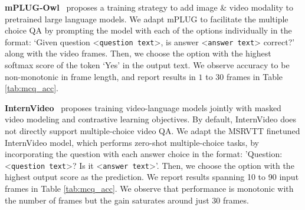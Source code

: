 \noindent\textbf{mPLUG-Owl}~\cite{mplugowl} proposes a training strategy to add image \& video modality to pretrained large language models. We adapt mPLUG to facilitate the multiple choice QA by prompting the model with each of the options individually in the format: `Given question <\texttt{question text}>, is answer <\texttt{answer text}> correct?' along with the video frames. Then, we choose the option with the highest softmax score of the token `Yes' in the output text. We observe accuracy to be non-monotonic in frame length, and report results in $1$ to $30$ frames in Table \ref{tab:mcq_acc}.

\noindent\textbf{InternVideo}~\cite{internvideo} proposes training video-language models jointly with masked video modeling and contrastive learning objectives. By default, InternVideo does not directly support multiple-choice video QA. We adapt the MSRVTT finetuned InternVideo model, which performs zero-shot multiple-choice tasks, by incorporating the question with each answer choice in the format: 'Question: <\texttt{question text}>? Is it <\texttt{answer text}>'. Then, we choose the option with the highest output score as the prediction. We report results spanning 10 to 90 input frames in Table \ref{tab:mcq_acc}. We observe that performance is monotonic with the number of frames but the gain saturates around just $30$ frames.  

